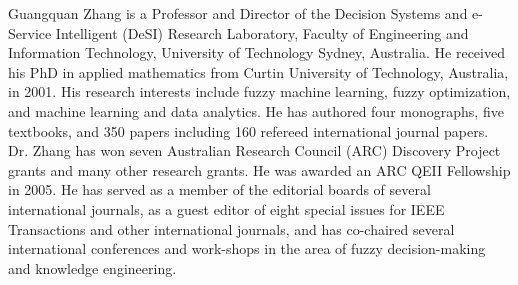 \documentclass[journal]{IEEEtran}
\begin{document}
\vspace{-0.5cm}
\begin{IEEEbiography}{Guangquan Zhang}
is a Professor and Director of the Decision Systems and e-Service Intelligent (DeSI) Research Laboratory, Faculty of Engineering and Information Technology, University of Technology Sydney, Australia. He received his PhD in applied mathematics from Curtin University of Technology, Australia, in 2001.
His research interests include fuzzy machine learning, fuzzy optimization, and machine learning and data analytics. He has authored four monographs, five textbooks, and 350 papers including 160 refereed international journal papers. Dr. Zhang has won seven Australian Research Council (ARC) Discovery Project grants and many other research grants. He was awarded an ARC QEII Fellowship in 2005. He has served as a member of the editorial boards of several international journals, as a guest editor of eight special issues for IEEE Transactions and other international journals, and has co-chaired several international conferences and work-shops in the area of fuzzy decision-making and knowledge engineering. 
\end{IEEEbiography}




\newpage
\newpage


\end{document}
